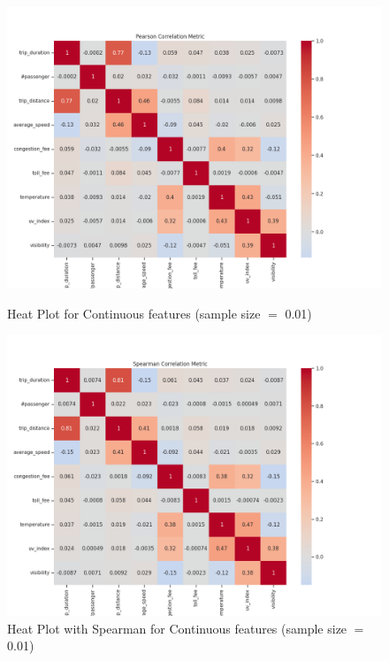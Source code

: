 \documentclass[11pt]{article}
\begin{document}
\begin{figure}[h!]
  \centering
  \begin{minipage}[b]{0.499\textwidth}
    \includegraphics[width=\textwidth]{head_plot_for_continuous_features.png}
    \caption{Heat Plot for Continuous features (sample size $=$ 0.01)}
    \label{fig:image1}
  \end{minipage}
  \hfill
  \begin{minipage}[b]{0.49\textwidth}
    \includegraphics[width=\textwidth]{head_plot_with_spearman_for_continuous_features.png}
    \caption{Heat Plot with Spearman for Continuous features (sample size $=$ 0.01)}
    \label{fig:image2}
  \end{minipage}
\end{figure}
\end{document}
